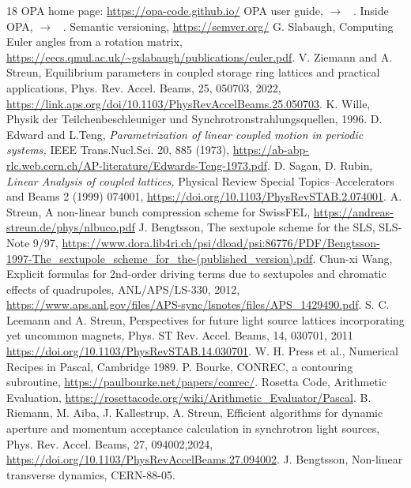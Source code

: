 \documentclass[12pt]{article}
\newcommand{\see}{\mbox{$\rightarrow$}}
\begin{document}
\begin{thebibliography}{18}
OPA home page: \url{https://opa-code.github.io/} 
OPA user guide, \see~ \cite{opapage}.
Inside OPA, \see~ \cite{opapage}.
Semantic versioning, \url{https://semver.org/}
G. Slabaugh, Computing Euler angles from a rotation matrix, \url{https://eecs.qmul.ac.uk/~gslabaugh/publications/euler.pdf}.
V. Ziemann and A. Streun, Equilibrium parameters in coupled storage ring lattices and practical applications, Phys. Rev. Accel. Beams, 25, 050703, 2022, \url{https://link.aps.org/doi/10.1103/PhysRevAccelBeams.25.050703}.
K. Wille, Physik der Teilchenbeschleuniger und Synchrotronstrahlungsquellen, 1996.
 D. Edward and L.Teng, {\em Parametrization of linear coupled motion in periodic
systems,} IEEE Trans.Nucl.Sci. 20, 885 (1973), \url{https://ab-abp-rlc.web.cern.ch/AP-literature/Edwards-Teng-1973.pdf}.
D. Sagan, D. Rubin, {\em Linear Analysis of coupled lattices,} Physical Review Special
Topics--Accelerators and Beams 2 (1999) 074001, \url{https://doi.org/10.1103/PhysRevSTAB.2.074001}.
A. Streun, A non-linear bunch compression scheme for SwissFEL, \url{https://andreas-streun.de/phys/nlbuco.pdf}
J. Bengtsson, The sextupole scheme for the SLS, SLS-Note 9/97,  \url{https://www.dora.lib4ri.ch/psi/dload/psi:86776/PDF/Bengtsson-1997-The_sextupole_scheme_for_the-(published_version).pdf}.
Chun-xi Wang, Explicit formulas for 2nd-order driving terms due to sextupoles and chromatic effects of quadrupoles, ANL/APS/LS-330, 2012, \url{https://www.aps.anl.gov/files/APS-sync/lsnotes/files/APS_1429490.pdf}.
S. C. Leemann and A. Streun, Perspectives for future light source lattices incorporating yet uncommon magnets, Phys. ST Rev. Accel. Beams, 14, 030701, 2011 \url{https://doi.org/10.1103/PhysRevSTAB.14.030701}.
W. H. Press et al., Numerical Recipes in Pascal, Cambridge 1989.
P. Bourke, CONREC, a contouring subroutine, \url{https://paulbourke.net/papers/conrec/}.
Rosetta Code, Arithmetic Evaluation, \url{https://rosettacode.org/wiki/Arithmetic\_Evaluator/Pascal}.
B. Riemann, M. Aiba, J. Kallestrup, A. Streun, Efficient algorithms for dynamic aperture and momentum acceptance calculation in synchrotron light sources, Phys. Rev. Accel. Beams, 27, 094002,2024, \url{https://doi.org/10.1103/PhysRevAccelBeams.27.094002}.
J. Bengtsson, Non-linear transverse dynamics, CERN-88-05.
\end{thebibliography}
\end{document}

